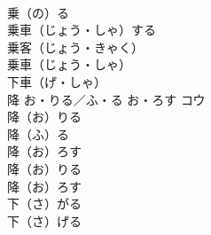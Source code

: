 \documentclass[8pt]{extreport}
\begin{document}
\begin{CJK}{UTF8}{min}
\\	乗（の）る　
\\	乗車（じょう・しゃ）する　
\\	乗客（じょう・きゃく）　
\\	乗車（じょう・しゃ） 
\\	下車（げ・しゃ）	
\\	降	お・りる／ふ・る お・ろす	コウ	
\\	降（お）りる　
\\	降（ふ）る　
\\	降（お）ろす　
\\	降（お）りる　
\\	降（お）ろす　
\\	下（さ）がる　
\\	下（さ）げる　
\end{CJK}
\end{document}

